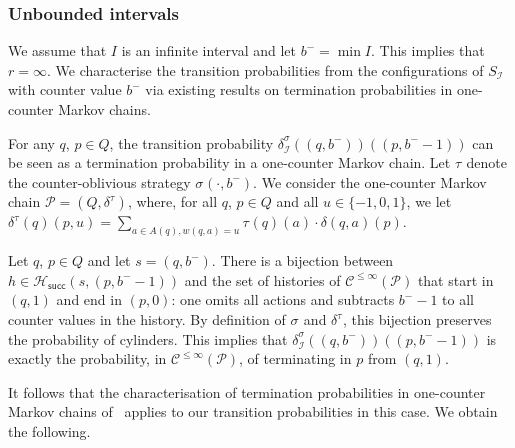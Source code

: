 \documentclass[a4paper,UKenglish,cleveref,autoref,thm-restate,colorlinks]{lipics-v2021}
\newcommand{\mdpStateSpace}{S}
\newcommand{\mdpTrans}{\delta}
\newcommand{\histPart}{\mathcal{H}}
\newcommand{\hist}{h}
\newcommand{\weight}{w}
\newcommand{\weightVal}{u}
\newcommand{\ocStateSpace}{Q}
\newcommand{\ocState}{q}
\newcommand{\ocStateB}{p}
\newcommand{\ocConfig}{s}
\newcommand{\ocActionSpace}{A}
\newcommand{\ocAction}{a}
\newcommand{\ocTrans}{\delta}
\newcommand{\counterUB}{r}
\newcommand{\mchain}{\mathcal{C}}
\newcommand{\ocChain}{\mathcal{P}}
\newcommand{\ocChainFin}[2]{\mchain^{\leq #2}(#1)}
\newcommand{\intPart}{\mathcal{I}}
\newcommand{\interval}{I}
\newcommand{\intBound}{b}
\newcommand{\intLB}{\intBound^-}
\newcommand{\compressChainStateSpace}{\mdpStateSpace_{\intPart}}
\newcommand{\compressChainTransTemplate}[2]{\mdpTrans^{#1}_{#2}}
\newcommand{\compressChainTrans}{\compressChainTransTemplate{\strat}{\intPart}}
\newcommand{\succHist}[2]{\histPart_{\mathsf{succ}}(#1, #2)}
\newcommand{\stratGeneric}[1]{{\sigma_{#1}}}
\newcommand{\strat}{\stratGeneric{}}
\newcommand{\stratBGeneric}[1]{{\tau_{#1}}}
\newcommand{\stratB}{\stratBGeneric{}}
\begin{document}
\subsubsection{Unbounded intervals}\label{section:abstraction:transitions:unbounded}
We assume that $\interval$ is an infinite interval and let $\intLB=\min\interval$.
This implies that $\counterUB=\infty$.
We characterise the transition probabilities from the configurations of $\compressChainStateSpace$ with counter value $\intLB$ via existing results on termination probabilities in one-counter Markov chains.

For any $\ocState$, $\ocStateB\in\ocStateSpace$, the transition probability $\compressChainTrans((\ocState, \intLB))((\ocStateB, \intLB-1))$ can be seen as a termination probability in a one-counter Markov chain.
Let $\stratB$ denote the counter-oblivious strategy $\strat(\cdot, \intLB)$.
We consider the one-counter Markov chain $\ocChain=(\ocStateSpace, \ocTrans^\stratB)$, where, for all $\ocState$, $\ocStateB\in\ocStateSpace$ and all $\weightVal\in\{-1, 0, 1\}$, we let $\ocTrans^\stratB(\ocState)(\ocStateB, \weightVal) = \sum_{\ocAction\in\ocActionSpace(\ocState), \weight(\ocState, \ocAction)=\weightVal}\stratB(\ocState)(\ocAction)\cdot\ocTrans(\ocState, \ocAction)(\ocStateB)$.

Let $\ocState$, $\ocStateB\in\ocStateSpace$ and let $\ocConfig = (\ocState, \intLB)$.
There is a bijection between $\hist\in\succHist{\ocConfig}{(\ocStateB, \intLB-1)}$ and the set of histories of $\ocChainFin{\ocChain}{\infty}$ that start in $(\ocState, 1)$ and end in $(\ocStateB, 0)$: one omits all actions and subtracts $\intLB-1$ to all counter values in the history.
By definition of $\strat$ and $\ocTrans^\stratB$, this bijection preserves the probability of cylinders.
This implies that $\compressChainTrans((\ocState, \intLB))((\ocStateB, \intLB-1))$ is exactly the probability, in $\ocChainFin{\ocChain}{\infty}$, of terminating in $\ocStateB$ from $(\ocState, 1)$.

It follows that the characterisation of termination probabilities in one-counter Markov chains of~\cite{DBLP:journals/lmcs/KuceraEM06} applies to our transition probabilities in this case.
We obtain the following.
\end{document}
